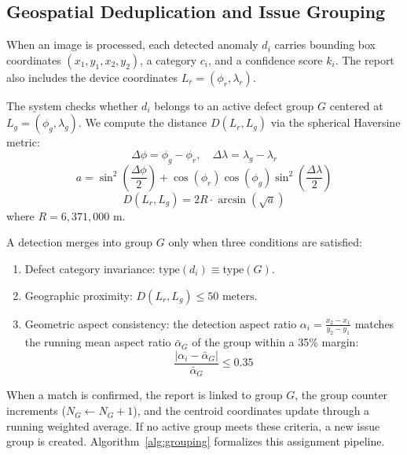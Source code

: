 \subsection{Geospatial Deduplication and Issue Grouping}
When an image is processed, each detected anomaly $d_i$ carries bounding box coordinates $(x_1, y_1, x_2, y_2)$, a category $c_i$, and a confidence score $k_i$. The report also includes the device coordinates $L_r = (\phi_r, \lambda_r)$.

The system checks whether $d_i$ belongs to an active defect group $G$ centered at $L_g = (\phi_g, \lambda_g)$. We compute the distance $D(L_r, L_g)$ via the spherical Haversine metric:
\begin{equation}
\Delta\phi = \phi_g - \phi_r, \quad \Delta\lambda = \lambda_g - \lambda_r
\end{equation}
\begin{equation}
a = \sin^2\left(\frac{\Delta\phi}{2}\right) + \cos(\phi_r)\cos(\phi_g)\sin^2\left(\frac{\Delta\lambda}{2}\right)
\end{equation}
\begin{equation}
D(L_r, L_g) = 2 R \cdot \arcsin\left(\sqrt{a}\right)
\end{equation}
where $R = 6,371,000\text{ m}$.

A detection merges into group $G$ only when three conditions are satisfied:
\begin{enumerate}
    \item Defect category invariance: $\text{type}(d_i) \equiv \text{type}(G)$.
    \item Geographic proximity: $D(L_r, L_g) \le 50\text{ meters}$.
    \item Geometric aspect consistency: the detection aspect ratio $\alpha_i = \frac{x_2 - x_1}{y_2 - y_1}$ matches the running mean aspect ratio $\bar{\alpha}_G$ of the group within a 35\% margin:
    \begin{equation}
    \frac{|\alpha_i - \bar{\alpha}_G|}{\bar{\alpha}_G} \le 0.35
    \end{equation}
\end{enumerate}
When a match is confirmed, the report is linked to group $G$, the group counter increments ($N_G \leftarrow N_G + 1$), and the centroid coordinates update through a running weighted average. If no active group meets these criteria, a new issue group is created. Algorithm~\ref{alg:grouping} formalizes this assignment pipeline.

